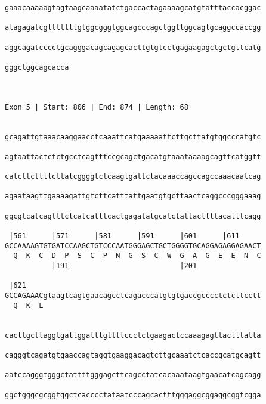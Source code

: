 \documentclass{article}
\begin{document}
\begin{Verbatim}
gaaacaaaaagtagtaagcaaaatatctgaccactagaaaagcatgtatttaccacggac
                                                            
atagagatcgtttttttgtggcgggtggcagcccagctggttggcagtgcaggccaccgg
                                                            
aggcagatcccctgcagggacagcagagcacttgtgtcctgagaagagctgctgttcatg
                                                            
gggctggcagcacca
               
               
 
Exon 5 | Start: 806 | End: 874 | Length: 68


gcagattgtaaacaaggaacctcaaattcatgaaaaattcttgcttatgtggcccatgtc
                                                            
agtaattactctctgcctcagtttccgcagctgacatgtaaataaaagcagttcatggtt
                                                            
catcttcttttcttatcggggtctcaagtgattctacaaaccagccagccaaacaatcag
                                                            
agaataagttgaaaagattgtcttcatttattgaatgtgcttaactcaggcccgggaaag
                                                            
ggcgtcatcagtttctcatcatttcactgagatatgcatctattacttttacatttcagg
                                                            
 |561      |571      |581      |591      |601      |611     
GCCAAAAGTGTGATCCAAGCTGTCCCAATGGGAGCTGCTGGGGTGCAGGAGAGGAGAACT
  Q  K  C  D  P  S  C  P  N  G  S  C  W  G  A  G  E  E  N  C
           |191                          |201               
  
 |621                                                       
GCCAGAAACgtaagtcagtgaacagcctcagacccatgtgtgaccgcccctctcttcctt
  Q  K  L                                                   
                                                            
  
cacttgcttaggtgattggatttgttttccctctgaagactccaaagagttactttatta
                                                            
cagggtcagatgtgaaccagtaggtgaaggacagtcttgcaaatctcaccgcatgcagtt
                                                            
aatccagggtgggctattttgggagcttcagcctatcacaaataagtgaacatcagcagg
                                                            
ggctgggcgcggtggctcacccctataatcccagcactttgggaggcggaggcggtcgga
                                                            

\end{Verbatim}
\end{document}
